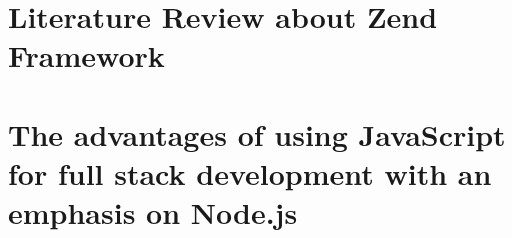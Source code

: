 \begin{appendices}
	\chapter{Literature Review about Zend Framework} \label{appendix:LiteratureReviewZF}
	
	
	\chapter{The advantages of using JavaScript for full stack development with an emphasis on Node.js} \label{appendix:LiteratureReviewJS}
    
\end{appendices}